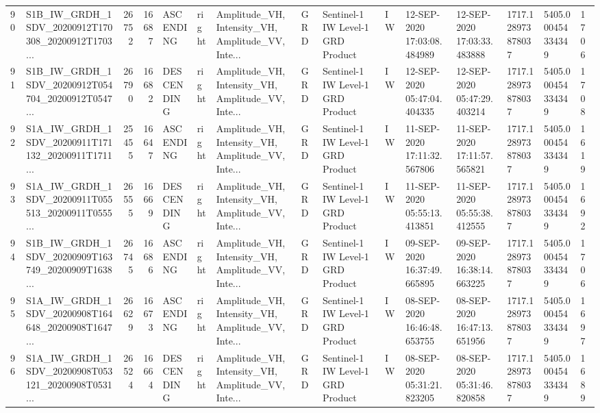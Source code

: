 \begin{tabular}{llrrlllllllllll}
90  &  S1B\_IW\_GRDH\_1SDV\_20200912T170308\_20200912T1703... &  26752 &   16687 &   ASCENDING &  right &  Amplitude\_VH, Intensity\_VH, Amplitude\_VV, Inte... &          GRD &  Sentinel-1 IW Level-1 GRD Product &              IW &  12-SEP-2020 17:03:08.484989 &  12-SEP-2020 17:03:33.483888 &          1717.128973878037 &  5405.000454334349 &       1706 \\
91  &  S1B\_IW\_GRDH\_1SDV\_20200912T054704\_20200912T0547... &  26790 &   16682 &  DESCENDING &  right &  Amplitude\_VH, Intensity\_VH, Amplitude\_VV, Inte... &          GRD &  Sentinel-1 IW Level-1 GRD Product &              IW &  12-SEP-2020 05:47:04.404335 &  12-SEP-2020 05:47:29.403214 &          1717.128973878037 &  5405.000454334349 &       1708 \\
92  &  S1A\_IW\_GRDH\_1SDV\_20200911T171132\_20200911T1711... &  25455 &   16647 &   ASCENDING &  right &  Amplitude\_VH, Intensity\_VH, Amplitude\_VV, Inte... &          GRD &  Sentinel-1 IW Level-1 GRD Product &              IW &  11-SEP-2020 17:11:32.567806 &  11-SEP-2020 17:11:57.565821 &          1717.128973878037 &  5405.000454334349 &       1619 \\
93  &  S1A\_IW\_GRDH\_1SDV\_20200911T055513\_20200911T0555... &  26555 &   16669 &  DESCENDING &  right &  Amplitude\_VH, Intensity\_VH, Amplitude\_VV, Inte... &          GRD &  Sentinel-1 IW Level-1 GRD Product &              IW &  11-SEP-2020 05:55:13.413851 &  11-SEP-2020 05:55:38.412555 &          1717.128973878037 &  5405.000454334349 &       1692 \\
94  &  S1B\_IW\_GRDH\_1SDV\_20200909T163749\_20200909T1638... &  26745 &   16686 &   ASCENDING &  right &  Amplitude\_VH, Intensity\_VH, Amplitude\_VV, Inte... &          GRD &  Sentinel-1 IW Level-1 GRD Product &              IW &  09-SEP-2020 16:37:49.665895 &  09-SEP-2020 16:38:14.663225 &          1717.128973878037 &  5405.000454334349 &       1706 \\
95  &  S1A\_IW\_GRDH\_1SDV\_20200908T164648\_20200908T1647... &  26629 &   16673 &   ASCENDING &  right &  Amplitude\_VH, Intensity\_VH, Amplitude\_VV, Inte... &          GRD &  Sentinel-1 IW Level-1 GRD Product &              IW &  08-SEP-2020 16:46:48.653755 &  08-SEP-2020 16:47:13.651956 &          1717.128973878037 &  5405.000454334349 &       1697 \\
96  &  S1A\_IW\_GRDH\_1SDV\_20200908T053121\_20200908T0531... &  26524 &   16664 &  DESCENDING &  right &  Amplitude\_VH, Intensity\_VH, Amplitude\_VV, Inte... &          GRD &  Sentinel-1 IW Level-1 GRD Product &              IW &  08-SEP-2020 05:31:21.823205 &  08-SEP-2020 05:31:46.820858 &          1717.128973878037 &  5405.000454334349 &       1689 \\

\end{tabular}
